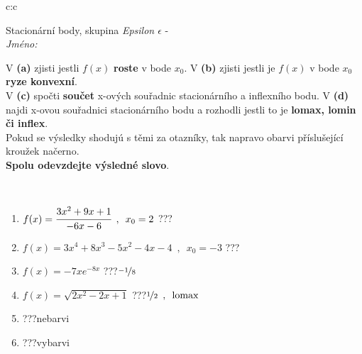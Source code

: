 \documentclass[10pt]{report}
\begin{document}
\newpage
\thispagestyle{empty}
\begin{tabular}{c:c}
\begin{minipage}[c][104.5mm][t]{0.5\linewidth}
\begin{center}
\vspace{7mm}
{\huge Stacionární body, skupina \textit{Epsilon $\epsilon$} -}\\[5mm]
\textit{Jméno:}\phantom{xxxxxxxxxxxxxxxxxxxxxxxxxxxxxxxxxxxxxxxxxxxxxxxxxxxxxxxxxxxxxxxxx}\\[5mm]
\begin{minipage}{0.95\linewidth}
\begin{center}
{\small V \textbf{(a)} zjisti jestli $f(x)$ \textbf{roste} v bode $x_0$. V \textbf{(b)} zjisti jestli je $f(x)$ v bode $x_0$ \textbf{ryze konvexní}.\\V \textbf{(c)} spočti \textbf{součet} x-ových souřadnic stacionárního a inflexního bodu. V \textbf{(d)} najdi x-ovou souřadnici stacionárního bodu a rozhodli jestli to je \textbf{lomax, lomin či inflex}.\\Pokud se výsledky shodujú s těmi za otazníky, tak napravo obarvi příslušející kroužek načerno.\\\textbf{Spolu odevzdejte výsledné slovo}}.
\end{center}
\end{minipage}
\\[1mm]
\begin{minipage}{0.79\linewidth}
\begin{center}
\begin{varwidth}{\linewidth}
\begin{enumerate}
\normalsize
\item $f(x)=\cfrac{3x^2+9x+1}{-6x-6}\enspace , \enspace x_0=2$\quad \dotfill\; ???\;\dotfill \quad {}
\item $f(x)=3x^4+8x^3-5x^2-4x-4\enspace , \enspace x_0=-3$\quad \dotfill\; ???\;\dotfill \quad {}
\item $f(x)=-7xe^{-8x}$\quad \dotfill\; ???\;\dotfill \quad $\nicefrac{-1}{8}$
\item $f(x)=\sqrt{2x^2-2x+1}$\quad \dotfill\; ???\;\dotfill \quad $\nicefrac{1}{2}\enspace , \enspace\mathrm{lomax}$
\item \quad \dotfill\; ???\;\dotfill \quad nebarvi
\item \quad \dotfill\; ???\;\dotfill \quad vybarvi
\end{enumerate}
\end{varwidth}
\end{center}

\end{minipage}
\end{center}
\end{minipage}
\end{tabular}
\end{document}

